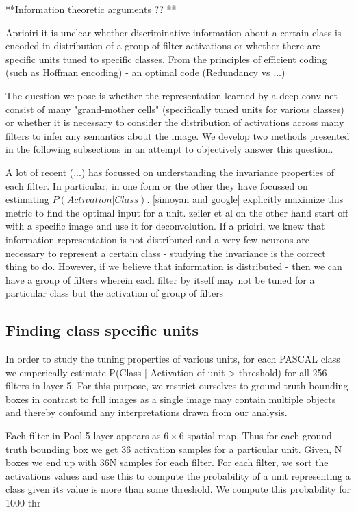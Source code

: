 \documentclass[runningheads]{llncs}
\begin{document}
**Information theoretic arguments ?? ** 

Aprioiri it is unclear whether discriminative information about a certain class is encoded in distribution of a group of filter activations or whether there are specific units tuned to specific classes. From the principles of efficient coding (such as Hoffman encoding) - an optimal code (Redundancy vs ...)

The question we pose is whether the representation learned by a deep conv-net consist of many "grand-mother cells" (specifically tuned units for various classes) or whether it is necessary to consider the distribution of activations across many filters to infer any semantics about the image. We develop two methods presented in the following subsections in an attempt to objectively answer this question.


A lot of recent (...) has focussed on understanding the invariance properties of each filter. In particular, in one form or the other they have focussed on estimating $P(Activation | Class)$. [simoyan and google] explicitly maximize this metric to find the optimal input for a unit. zeiler et al on the other hand start off with a specific image and use it for deconvolution. If a prioiri, we knew that information representation is not distributed and a very few neurons are necessary to represent a certain class - studying the invariance is the correct thing to do. However, if we believe that information is distributed - then we can have a group of filters wherein each filter by itself may not be tuned for a particular class but the activation of group of filters 

\subsection{Finding class specific units}
\label{sub:class-specific-unit}
In order to study the tuning properties of various units, for each PASCAL class we emperically estimate P(Class | Activation of unit > threshold) for all 256 filters in layer 5. For this purpose, we restrict ourselves to ground truth bounding boxes in contrast to full images as a single image may contain multiple objects and thereby confound any interpretations drawn from our analysis. 

Each filter in Pool-5 layer appears as $6 \times 6$ spatial map. Thus for each ground truth bounding box we get 36 activation samples for a particular unit. Given, N boxes we end up with 36N samples for each filter. For each filter, we sort the activations values and use this to compute the probability of a unit representing a class given its value is more than some threshold. We compute this probability for 1000 thr
\end{document}
